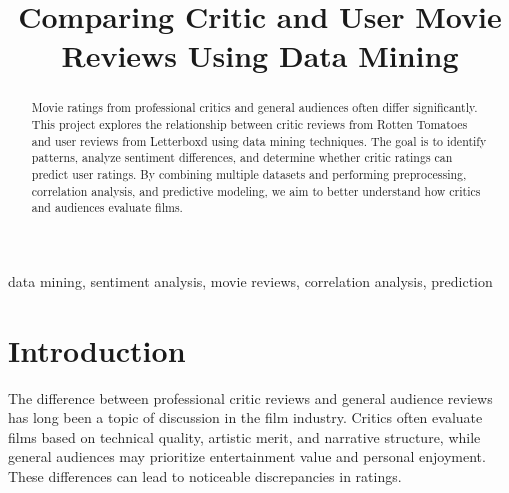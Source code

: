 \documentclass[conference]{IEEEtran}
\begin{document}
\title{Comparing Critic and User Movie Reviews Using Data Mining}


\author{
  \and
  \and
  \and
}

\maketitle

\begin{abstract}
  Movie ratings from professional critics and general audiences often differ significantly.
  This project explores the relationship between critic reviews from Rotten Tomatoes and
  user reviews from Letterboxd using data mining techniques. The goal is to identify patterns,
  analyze sentiment differences, and determine whether critic ratings can predict user ratings.
  By combining multiple datasets and performing preprocessing, correlation analysis, and
  predictive modeling, we aim to better understand how critics and audiences evaluate films.
\end{abstract}

\begin{IEEEkeywords}
  data mining, sentiment analysis, movie reviews, correlation analysis, prediction
\end{IEEEkeywords}

\section{Introduction}
The difference between professional critic reviews and general audience
reviews has long been a topic of discussion in the film industry. Critics
often evaluate films based on technical quality, artistic merit, and
narrative structure, while general audiences may prioritize entertainment
value and personal enjoyment. These differences can lead to noticeable
discrepancies in ratings.
\end{document}

